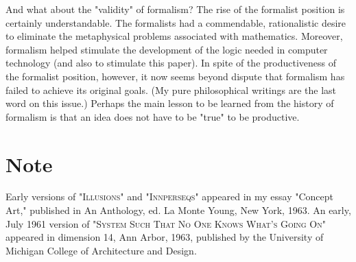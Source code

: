 And what about the "validity" of formalism? The rise of the formalist 
position is certainly understandable. The formalists had a commendable, 
rationalistic desire to eliminate the metaphysical problems associated with 
mathematics. Moreover, formalism helped stimulate the development of the 
logic needed in computer technology (and also to stimulate this paper). In 
spite of the productiveness of the formalist position, however, it now seems 
beyond dispute that formalism has failed to achieve its original goals. (My 
pure philosophical writings are the last word on this issue.) Perhaps the main 
lesson to be learned from the history of formalism is that an idea does not 
have to be "true" to be productive. 


\section*{Note}
Early versions of \textsc{"Illusions"} and \textsc{"Innperseqs"} appeared in my essay 
"Concept Art," published in An Anthology, ed. La Monte Young, New 
York, 1963. An early, July 1961 version of \textsc{"System Such That No One 
Knows What's Going On"} appeared in dimension 14, Ann Arbor, 1963, 
published by the University of Michigan College of Architecture and Design. 

